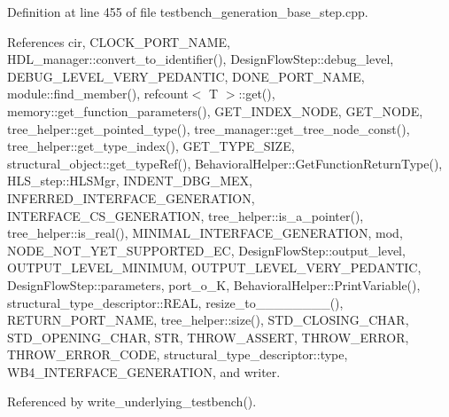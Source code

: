 Definition at line 455 of file testbench\+\_\+generation\+\_\+base\+\_\+step.\+cpp.



References cir, C\+L\+O\+C\+K\+\_\+\+P\+O\+R\+T\+\_\+\+N\+A\+ME, H\+D\+L\+\_\+manager\+::convert\+\_\+to\+\_\+identifier(), Design\+Flow\+Step\+::debug\+\_\+level, D\+E\+B\+U\+G\+\_\+\+L\+E\+V\+E\+L\+\_\+\+V\+E\+R\+Y\+\_\+\+P\+E\+D\+A\+N\+T\+IC, D\+O\+N\+E\+\_\+\+P\+O\+R\+T\+\_\+\+N\+A\+ME, module\+::find\+\_\+member(), refcount$<$ T $>$\+::get(), memory\+::get\+\_\+function\+\_\+parameters(), G\+E\+T\+\_\+\+I\+N\+D\+E\+X\+\_\+\+N\+O\+DE, G\+E\+T\+\_\+\+N\+O\+DE, tree\+\_\+helper\+::get\+\_\+pointed\+\_\+type(), tree\+\_\+manager\+::get\+\_\+tree\+\_\+node\+\_\+const(), tree\+\_\+helper\+::get\+\_\+type\+\_\+index(), G\+E\+T\+\_\+\+T\+Y\+P\+E\+\_\+\+S\+I\+ZE, structural\+\_\+object\+::get\+\_\+type\+Ref(), Behavioral\+Helper\+::\+Get\+Function\+Return\+Type(), H\+L\+S\+\_\+step\+::\+H\+L\+S\+Mgr, I\+N\+D\+E\+N\+T\+\_\+\+D\+B\+G\+\_\+\+M\+EX, I\+N\+F\+E\+R\+R\+E\+D\+\_\+\+I\+N\+T\+E\+R\+F\+A\+C\+E\+\_\+\+G\+E\+N\+E\+R\+A\+T\+I\+ON, I\+N\+T\+E\+R\+F\+A\+C\+E\+\_\+\+C\+S\+\_\+\+G\+E\+N\+E\+R\+A\+T\+I\+ON, tree\+\_\+helper\+::is\+\_\+a\+\_\+pointer(), tree\+\_\+helper\+::is\+\_\+real(), M\+I\+N\+I\+M\+A\+L\+\_\+\+I\+N\+T\+E\+R\+F\+A\+C\+E\+\_\+\+G\+E\+N\+E\+R\+A\+T\+I\+ON, mod, N\+O\+D\+E\+\_\+\+N\+O\+T\+\_\+\+Y\+E\+T\+\_\+\+S\+U\+P\+P\+O\+R\+T\+E\+D\+\_\+\+EC, Design\+Flow\+Step\+::output\+\_\+level, O\+U\+T\+P\+U\+T\+\_\+\+L\+E\+V\+E\+L\+\_\+\+M\+I\+N\+I\+M\+UM, O\+U\+T\+P\+U\+T\+\_\+\+L\+E\+V\+E\+L\+\_\+\+V\+E\+R\+Y\+\_\+\+P\+E\+D\+A\+N\+T\+IC, Design\+Flow\+Step\+::parameters, port\+\_\+o\+\_\+K, Behavioral\+Helper\+::\+Print\+Variable(), structural\+\_\+type\+\_\+descriptor\+::\+R\+E\+AL, resize\+\_\+to\+\_\+\_\+\_\+\_\+\_\+\_\+\_\+\_(), R\+E\+T\+U\+R\+N\+\_\+\+P\+O\+R\+T\+\_\+\+N\+A\+ME, tree\+\_\+helper\+::size(), S\+T\+D\+\_\+\+C\+L\+O\+S\+I\+N\+G\+\_\+\+C\+H\+AR, S\+T\+D\+\_\+\+O\+P\+E\+N\+I\+N\+G\+\_\+\+C\+H\+AR, S\+TR, T\+H\+R\+O\+W\+\_\+\+A\+S\+S\+E\+RT, T\+H\+R\+O\+W\+\_\+\+E\+R\+R\+OR, T\+H\+R\+O\+W\+\_\+\+E\+R\+R\+O\+R\+\_\+\+C\+O\+DE, structural\+\_\+type\+\_\+descriptor\+::type, W\+B4\+\_\+\+I\+N\+T\+E\+R\+F\+A\+C\+E\+\_\+\+G\+E\+N\+E\+R\+A\+T\+I\+ON, and writer.



Referenced by write\+\_\+underlying\+\_\+testbench().

